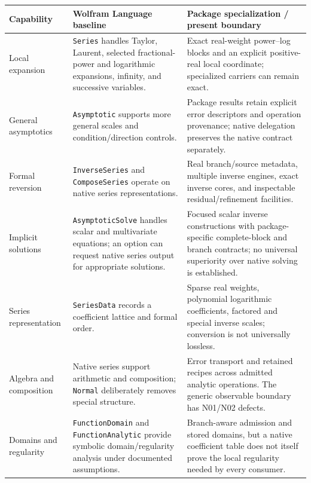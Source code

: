 \documentclass[11pt,letterpaper]{article}
\newcommand{\code}[1]{\nolinkurl{#1}}
\begin{document}
\begin{longtable}{@{}P{0.18\textwidth}P{0.37\textwidth}P{0.40\textwidth}@{}}
\toprule
Capability & Wolfram Language baseline & Package specialization / present boundary\\\midrule\endhead
Local expansion & \code{Series} handles Taylor, Laurent, selected fractional-power and logarithmic expansions, infinity, and successive variables. & Exact real-weight power--log blocks and an explicit positive-real local coordinate; specialized carriers can remain exact.~\cite{wl-series,main}\\
General asymptotics & \code{Asymptotic} supports more general scales and condition/direction controls. & Package results retain explicit error descriptors and operation provenance; native delegation preserves the native contract separately.~\cite{wl-asymptotic,nativecontracts}\\
Formal reversion & \code{InverseSeries} and \code{ComposeSeries} operate on native series representations. & Real branch/source metadata, multiple inverse engines, exact inverse cores, and inspectable residual/refinement facilities.~\cite{wl-inverse,wl-compose,main}\\
Implicit solutions & \code{AsymptoticSolve} handles scalar and multivariate equations; an option can request native series output for appropriate solutions. & Focused scalar inverse constructions with package-specific complete-block and branch contracts; no universal superiority over native solving is established.~\cite{wl-solve,readme}\\
Series representation & \code{SeriesData} records a coefficient lattice and formal order. & Sparse real weights, polynomial logarithmic coefficients, factored and special inverse scales; conversion is not universally lossless.~\cite{wl-seriesdata,operations,gamma}\\
Algebra and composition & Native series support arithmetic and composition; \code{Normal} deliberately removes special structure. & Error transport and retained recipes across admitted analytic operations. The generic observable boundary has N01/N02 defects.~\cite{wl-compose,wl-normal,operations}\\
Domains and regularity & \code{FunctionDomain} and \code{FunctionAnalytic} provide symbolic domain/regularity analysis under documented assumptions. & Branch-aware admission and stored domains, but a native coefficient table does not itself prove the local regularity needed by every consumer.~\cite{wl-domain,wl-analytic,operations}\\

\end{longtable}
\end{document}
